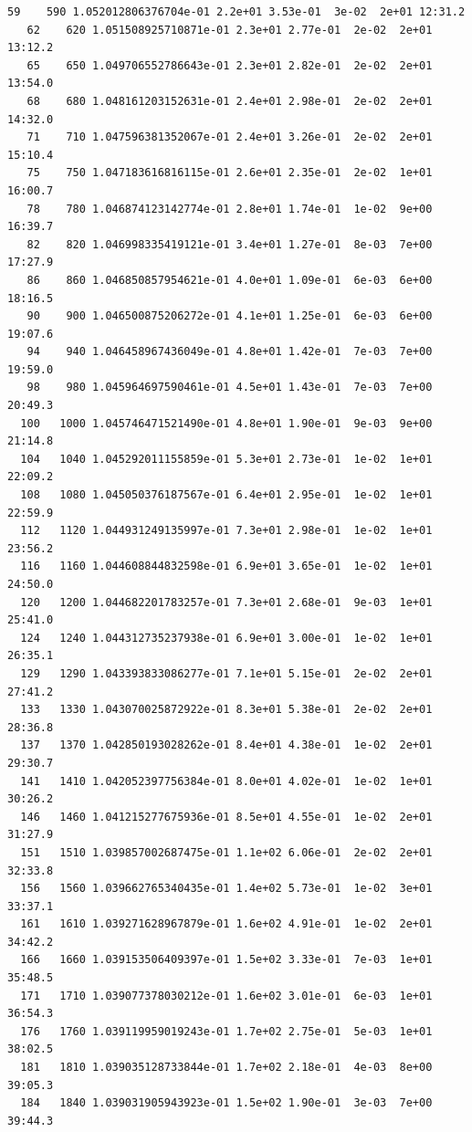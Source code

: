 \documentclass[11pt]{article}
\begin{document}
\begin{Verbatim}[commandchars=\\\{\}]
   59    590 1.052012806376704e-01 2.2e+01 3.53e-01  3e-02  2e+01 12:31.2
   62    620 1.051508925710871e-01 2.3e+01 2.77e-01  2e-02  2e+01 13:12.2
   65    650 1.049706552786643e-01 2.3e+01 2.82e-01  2e-02  2e+01 13:54.0
   68    680 1.048161203152631e-01 2.4e+01 2.98e-01  2e-02  2e+01 14:32.0
   71    710 1.047596381352067e-01 2.4e+01 3.26e-01  2e-02  2e+01 15:10.4
   75    750 1.047183616816115e-01 2.6e+01 2.35e-01  2e-02  1e+01 16:00.7
   78    780 1.046874123142774e-01 2.8e+01 1.74e-01  1e-02  9e+00 16:39.7
   82    820 1.046998335419121e-01 3.4e+01 1.27e-01  8e-03  7e+00 17:27.9
   86    860 1.046850857954621e-01 4.0e+01 1.09e-01  6e-03  6e+00 18:16.5
   90    900 1.046500875206272e-01 4.1e+01 1.25e-01  6e-03  6e+00 19:07.6
   94    940 1.046458967436049e-01 4.8e+01 1.42e-01  7e-03  7e+00 19:59.0
   98    980 1.045964697590461e-01 4.5e+01 1.43e-01  7e-03  7e+00 20:49.3
  100   1000 1.045746471521490e-01 4.8e+01 1.90e-01  9e-03  9e+00 21:14.8
  104   1040 1.045292011155859e-01 5.3e+01 2.73e-01  1e-02  1e+01 22:09.2
  108   1080 1.045050376187567e-01 6.4e+01 2.95e-01  1e-02  1e+01 22:59.9
  112   1120 1.044931249135997e-01 7.3e+01 2.98e-01  1e-02  1e+01 23:56.2
  116   1160 1.044608844832598e-01 6.9e+01 3.65e-01  1e-02  1e+01 24:50.0
  120   1200 1.044682201783257e-01 7.3e+01 2.68e-01  9e-03  1e+01 25:41.0
  124   1240 1.044312735237938e-01 6.9e+01 3.00e-01  1e-02  1e+01 26:35.1
  129   1290 1.043393833086277e-01 7.1e+01 5.15e-01  2e-02  2e+01 27:41.2
  133   1330 1.043070025872922e-01 8.3e+01 5.38e-01  2e-02  2e+01 28:36.8
  137   1370 1.042850193028262e-01 8.4e+01 4.38e-01  1e-02  2e+01 29:30.7
  141   1410 1.042052397756384e-01 8.0e+01 4.02e-01  1e-02  1e+01 30:26.2
  146   1460 1.041215277675936e-01 8.5e+01 4.55e-01  1e-02  2e+01 31:27.9
  151   1510 1.039857002687475e-01 1.1e+02 6.06e-01  2e-02  2e+01 32:33.8
  156   1560 1.039662765340435e-01 1.4e+02 5.73e-01  1e-02  3e+01 33:37.1
  161   1610 1.039271628967879e-01 1.6e+02 4.91e-01  1e-02  2e+01 34:42.2
  166   1660 1.039153506409397e-01 1.5e+02 3.33e-01  7e-03  1e+01 35:48.5
  171   1710 1.039077378030212e-01 1.6e+02 3.01e-01  6e-03  1e+01 36:54.3
  176   1760 1.039119959019243e-01 1.7e+02 2.75e-01  5e-03  1e+01 38:02.5
  181   1810 1.039035128733844e-01 1.7e+02 2.18e-01  4e-03  8e+00 39:05.3
  184   1840 1.039031905943923e-01 1.5e+02 1.90e-01  3e-03  7e+00 39:44.3
    \end{Verbatim}
\end{document}
